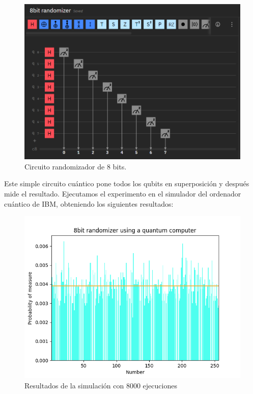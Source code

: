 \documentclass[11pt]{article}
\theoremstyle{plain}
\begin{document}
\begin{figure}[H]
	\centering
	\includegraphics[scale=0.7]{figures/8bits_rand.png}
	\caption{Circuito randomizador de 8 bits.}
\end{figure}

Este simple circuito cuántico pone todos los qubits en superposición y después mide el resultado. Ejecutamos el experimento en el simulador del ordenador cuántico de IBM, obteniendo los siguientes resultados:

\begin{figure}[H]
	\centering
	\includegraphics[scale=0.7]{figures/barplot_quantum.png}
	\caption{Resultados de la simulación con 8000 ejecuciones}
\end{figure}
\end{document}
